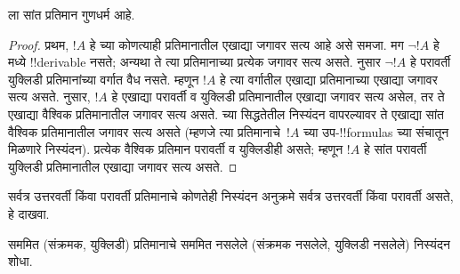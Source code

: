 \documentclass[../../../include/open-logic-section]{subfiles}
\begin{document}
\begin{cor}
   ला सांत प्रतिमान गुणधर्म आहे.
\end{cor}

\begin{proof}
  प्रथम, $!A$ हे  च्या कोणत्याही प्रतिमानातील एखाद्या
  जगावर सत्य आहे असे समजा. मग $\lnot!A$ हे  मध्ये
  !!{derivable} नसते; अन्यथा ते त्या प्रतिमानाच्या प्रत्येक जगावर
  सत्य असते.  नुसार $\lnot!A$
  हे परावर्ती युक्लिडी प्रतिमानांच्या वर्गात वैध नसते. म्हणून $!A$
  हे त्या वर्गातील एखाद्या प्रतिमानाच्या एखाद्या जगावर सत्य असते.
   नुसार,
  $!A$ हे एखाद्या परावर्ती व युक्लिडी प्रतिमानातील
  एखाद्या जगावर सत्य असेल, तर ते एखाद्या वैश्विक
  प्रतिमानातील जगावर सत्य असते.
   च्या सिद्धतेतील निस्यंदन वापरल्यावर
  ते एखाद्या सांत
  वैश्विक प्रतिमानातील जगावर सत्य असते
  (म्हणजे त्या प्रतिमानाचे~$!A$ च्या उप-!!{formula}s
  च्या संचातून मिळणारे निस्यंदन).
  प्रत्येक वैश्विक प्रतिमान परावर्ती व युक्लिडीही असते;
  म्हणून $!A$ हे सांत परावर्ती युक्लिडी प्रतिमानातील
  एखाद्या जगावर सत्य असते.
\end{proof}

\begin{prob}
  सर्वत्र उत्तरवर्ती किंवा परावर्ती प्रतिमानाचे
  कोणतेही निस्यंदन अनुक्रमे सर्वत्र उत्तरवर्ती किंवा
  परावर्ती असते, हे दाखवा.
\end{prob}

\begin{prob}
  सममित (संक्रमक, युक्लिडी) प्रतिमानाचे
  सममित नसलेले (संक्रमक नसलेले, युक्लिडी नसलेले)
  निस्यंदन शोधा.
\end{prob}
\end{document}
